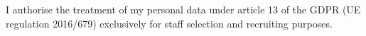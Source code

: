 \documentclass[a4paper,british]{twentysecondcv} %
\begin{document}
\vspace*{\fill}
I authorise the treatment of my personal data under article 13 of the GDPR (UE regulation 2016/679) exclusively for staff selection and recruiting purposes.










\end{document}
